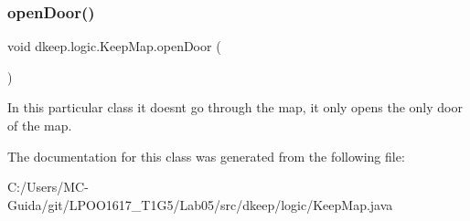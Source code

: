 \subsubsection{\texorpdfstring{open\+Door()}{openDoor()}}
{\footnotesize\ttfamily void dkeep.\+logic.\+Keep\+Map.\+open\+Door (\begin{DoxyParamCaption}{ }\end{DoxyParamCaption})}

In this particular class it doesn\textquotesingle{}t go through the map, it only opens the only door of the map. 

The documentation for this class was generated from the following file\+:\begin{DoxyCompactItemize}
\item 
C\+:/\+Users/\+M\+C-\/\+Guida/git/\+L\+P\+O\+O1617\+\_\+\+T1\+G5/\+Lab05/src/dkeep/logic/Keep\+Map.\+java\end{DoxyCompactItemize}
